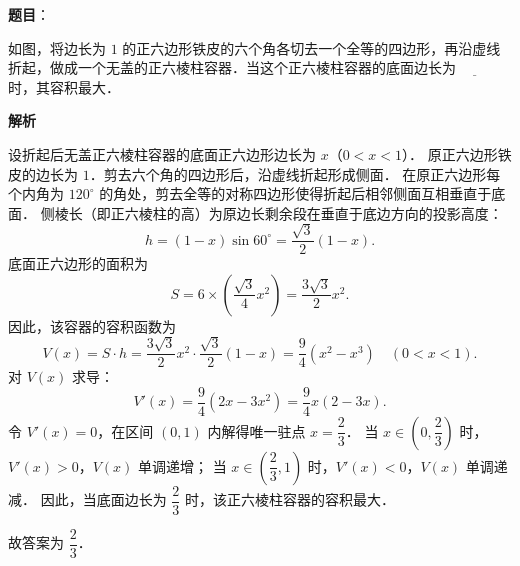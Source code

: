 \begin{answer}

\textbf{题目}：

如图，将边长为 $1$ 的正六边形铁皮的六个角各切去一个全等的四边形，再沿虚线折起，做成一个无盖的正六棱柱容器．当这个正六棱柱容器的底面边长为 $\underline{\quad\quad}$ 时，其容积最大．
\nopagebreak[4]
\begin{center}\end{center}
\nopagebreak[4]
\textbf{解析}

设折起后无盖正六棱柱容器的底面正六边形边长为 $x$（$0 < x < 1$）．
原正六边形铁皮的边长为 $1$．剪去六个角的四边形后，沿虚线折起形成侧面．
在原正六边形每个内角为 $120^\circ$ 的角处，剪去全等的对称四边形使得折起后相邻侧面互相垂直于底面．
侧棱长（即正六棱柱的高）为原边长剩余段在垂直于底边方向的投影高度：
\nopagebreak[4]
\[
h = (1 - x)\sin 60^\circ = \frac{\sqrt{3}}{2}(1 - x).
\]
底面正六边形的面积为
\nopagebreak[4]
\[
S = 6 \times \left(\frac{\sqrt{3}}{4}x^2\right) = \frac{3\sqrt{3}}{2}x^2.
\]
因此，该容器的容积函数为
\nopagebreak[4]
\[
V(x) = S \cdot h = \frac{3\sqrt{3}}{2}x^2 \cdot \frac{\sqrt{3}}{2}(1 - x) = \frac{9}{4}(x^2 - x^3) \quad (0 < x < 1).
\]
对 $V(x)$ 求导：
\nopagebreak[4]
\[
V'(x) = \frac{9}{4}(2x - 3x^2) = \frac{9}{4}x(2 - 3x).
\]
令 $V'(x) = 0$，在区间 $(0, 1)$ 内解得唯一驻点 $x = \dfrac{2}{3}$．
当 $x \in \left(0, \dfrac{2}{3}\right)$ 时，$V'(x) > 0$，$V(x)$ 单调递增；
当 $x \in \left(\dfrac{2}{3}, 1\right)$ 时，$V'(x) < 0$，$V(x)$ 单调递减．
因此，当底面边长为 $\dfrac{2}{3}$ 时，该正六棱柱容器的容积最大．
\nopagebreak[4]
\begin{center}\end{center}
\nopagebreak[4]
故答案为 $\dfrac{2}{3}$．


\end{answer}
